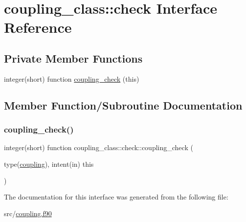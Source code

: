 \hypertarget{interfacecoupling__class_1_1check}{}\section{coupling\+\_\+class\+:\+:check Interface Reference}
\label{interfacecoupling__class_1_1check}
\subsection*{Private Member Functions}
\begin{DoxyCompactItemize}
\item 
integer(short) function \hyperlink{interfacecoupling__class_1_1check_a79a4c19eeb3531c0379020d9dcd90247}{coupling\+\_\+check} (this)
\end{DoxyCompactItemize}


\subsection{Member Function/\+Subroutine Documentation}
\mbox{\label{interfacecoupling__class_1_1check_a79a4c19eeb3531c0379020d9dcd90247}} 
\subsubsection{\texorpdfstring{coupling\+\_\+check()}{coupling\_check()}}
{\footnotesize\ttfamily integer(short) function coupling\+\_\+class\+::check\+::coupling\+\_\+check (\begin{DoxyParamCaption}\item[{type(\hyperlink{structcoupling__class_1_1coupling}{coupling}), intent(in)}]{this }\end{DoxyParamCaption})\hspace{0.3cm}{\ttfamily [private]}}



The documentation for this interface was generated from the following file\+:\begin{DoxyCompactItemize}
\item 
src/\hyperlink{coupling_8f90}{coupling.\+f90}\end{DoxyCompactItemize}
